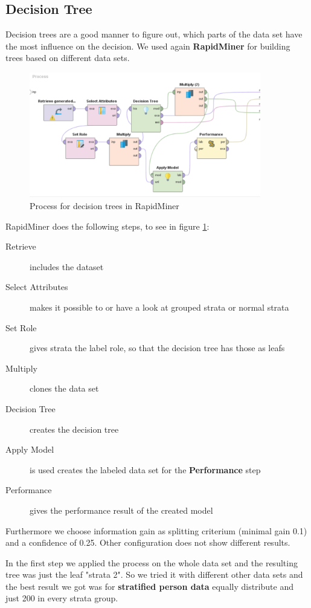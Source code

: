 \subsection{Decision Tree} \label{subsec: decisiontree}
Decision trees are a good manner to figure out, which parts of the data set have the most influence on the decision. We used again \textbf{RapidMiner} for building trees based on different data sets. 

\begin{figure}[!htbp]
\centering
\includegraphics[width = 0.9\textwidth]{DecisionTreeRapidModel.PNG}
\caption{Process for decision trees in RapidMiner}
\label{fig: RapDec}
\end{figure}

RapidMiner does the following steps, to see in figure \ref{fig: RapDec}:
\begin{description}
	\item[Retrieve] includes the dataset
	\item[Select Attributes] makes it possible to or have a look at grouped strata or normal strata
	\item[Set Role] gives strata the label role, so that the decision tree has those as leafs
	\item[Multiply] clones the data set 
	\item[Decision Tree] creates the decision tree
	\item[Apply Model] is used creates the labeled data set for the \textbf{Performance} step
	\item[Performance] gives the performance result of the created model
\end{description}

Furthermore we choose information gain as splitting criterium (minimal gain 0.1) and a confidence of 0.25. Other configuration does not show different results.

In the first step we applied the process on the whole data set and the resulting tree was just the leaf "strata 2". So we tried it with different other data sets and the best result we got was for \textbf{stratified person data} equally distribute and just 200 in every strata group.

